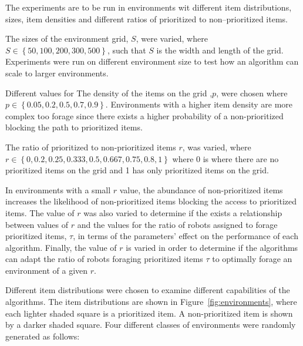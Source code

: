 The experiments are to be run in environments wit different item distributions, sizes, item densities and different ratios of prioritized to non--prioritized items. 

The sizes of the environment grid, $S$, were varied, where $S\in \left\{ 50,100,200,300, 500\right\}$, such that $S$ is the width and length of the grid.  Experiments were run on different environment size to test how an algorithm can scale to larger environments.

Different values for The density of the items on the grid ,$p$, were chosen where $p\in\left\{ 0.05, 0.2, 0.5, 0.7, 0.9\right\}$. Environments with a higher item density are more complex too forage since there exists a higher probability of a non-prioritized blocking the path to prioritized items.

The ratio of prioritized to non-prioritized items $r$, was varied, where $r\in \left\{0, 0.2,0.25, 0.333, 0.5, 0.667, 0.75, 0.8, 1\right\}$ where 0 is where there are no prioritized items on the grid and 1 has only prioritized items on the grid.

In environments with a small $r$ value, the abundance of non-prioritized items increases the likelihood of non-prioritized items blocking the access to prioritized items. The value of $r$ was also varied to determine if the exists a relationship between values of $r$ and the values for the ratio of robots assigned to forage prioritized items, $\tau$, in terms of the parameters' effect on the performance of each algorithm. Finally, the value of $r$ is varied in order to determine if the algorithms can adapt the ratio of robots foraging prioritized items $\tau$ to optimally forage an environment of a given $r$. 

Different item distributions were chosen to examine different capabilities of the algorithms. The item distributions are shown in Figure~\ref{fig:environments}, where each lighter shaded square is a prioritized item. A non-prioritized item is shown by a darker shaded square. Four different classes of environments were randomly generated as follows:

